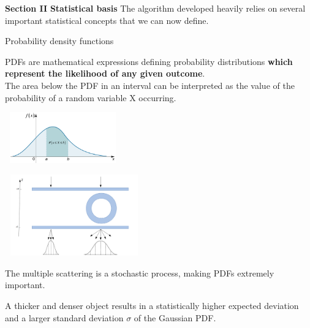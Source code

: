 \documentclass[8 pt]{beamer}
\begin{document}
\begin{frame}{}
\centering
	\huge{\textbf{\color{mycolor} Section II}} \newline
	\LARGE{\textbf{\color{mycolor} Statistical basis \color{black}}} \vfill
\Large{The algorithm developed heavily relies on several important statistical concepts that we can now define.} \vfill
\end{frame}

\begin{frame}{Probability density functions}

\begin{minipage}[c]{.50\textwidth}
\justifying
PDFs are mathematical expressions defining probability distributions \textbf{which represent the likelihood of any given outcome}. \\ \vspace{10pt}
The area below the PDF in an interval can be interpreted as the value of the probability of a random variable X occurring. 
\end{minipage}
\begin{minipage}[c]{.50\textwidth}
\begin{center}
\includegraphics[width=5cm, height=2.2cm]{figs/PDF.png}
\end{center}
\end{minipage} \vfill

\begin{minipage}[c]{.50\textwidth}
\includegraphics[width=6cm, height=3.5cm]{figs/pdfs.png}
\end{minipage}
\begin{minipage}[c]{.50\textwidth}
\justifying
The multiple scattering is a stochastic process, making PDFs extremely important. 

\begin{exampleblock}{}
\justifying A thicker and denser object results in a statistically higher expected deviation and a larger standard deviation $\sigma$ of the Gaussian PDF. \end{exampleblock}

\end{minipage}
\end{frame}
\end{document}
